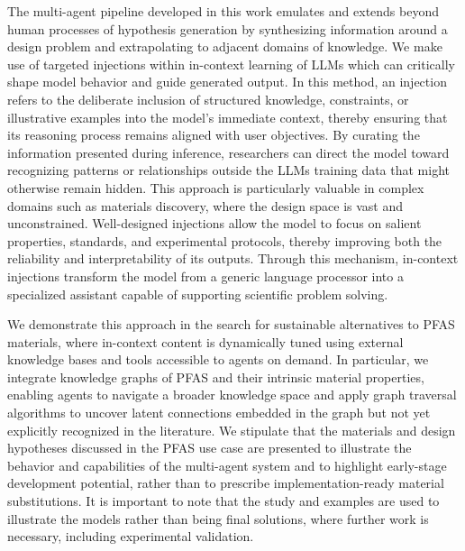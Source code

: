 The multi-agent pipeline developed in this work emulates and extends beyond human processes of hypothesis generation by synthesizing information around a design problem and extrapolating to adjacent domains of knowledge. We make use of targeted injections within in-context learning of LLMs which can critically shape model behavior and guide generated output. In this method, an injection refers to the deliberate inclusion of structured knowledge, constraints, or illustrative examples into the model’s immediate context, thereby ensuring that its reasoning process remains aligned with user objectives. By curating the information presented during inference, researchers can direct the model toward recognizing patterns or relationships outside the LLMs training data that might otherwise remain hidden. This approach is particularly valuable in complex domains such as materials discovery, where the design space is vast and unconstrained. Well-designed injections allow the model to focus on salient properties, standards, and experimental protocols, thereby improving both the reliability and interpretability of its outputs. Through this mechanism, in-context injections transform the model from a generic language processor into a specialized assistant capable of supporting scientific problem solving.

We demonstrate this approach in the search for sustainable alternatives to PFAS materials, where in-context content is dynamically tuned using external knowledge bases and tools accessible to agents on demand. In particular, we integrate knowledge graphs of PFAS and their intrinsic material properties, enabling agents to navigate a broader knowledge space and apply graph traversal algorithms to uncover latent connections embedded in the graph but not yet explicitly recognized in the literature. We stipulate that the materials and design hypotheses discussed in the PFAS use case are presented to illustrate the behavior and capabilities of the multi-agent system and to highlight early-stage development potential, rather than to prescribe implementation-ready material substitutions. It is important to note that the study and examples are used to illustrate the models rather than being final solutions, where further work is necessary, including experimental validation.

